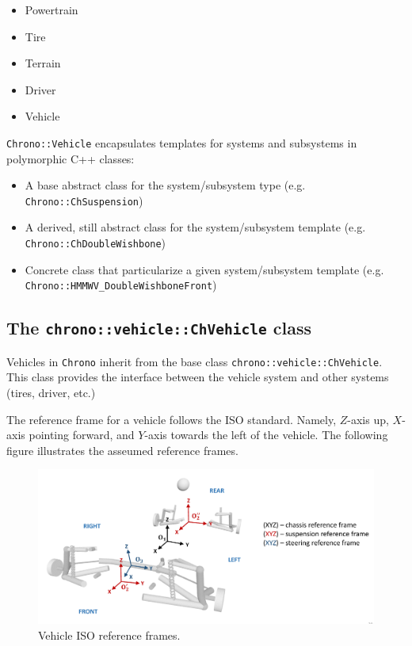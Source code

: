 \begin{itemize}
\item Powertrain
\item Tire
\item Terrain
\item Driver
\item Vehicle
\end{itemize}

\lstinline{Chrono::Vehicle} encapsulates templates for systems and subsystems in polymorphic C++ classes:

\begin{itemize}
\item A base abstract class for the system/subsystem type (e.g. \lstinline{Chrono::ChSuspension})
\item A derived, still abstract class for the system/subsystem template (e.g.  \lstinline{Chrono::ChDoubleWishbone})
\item Concrete class that particularize a given system/subsystem template (e.g. \lstinline{Chrono::HMMWV_DoubleWishboneFront})
\end{itemize}

\subsection{The \lstinline{chrono::vehicle::ChVehicle} class}

Vehicles in \lstinline{Chrono} inherit from the base class \lstinline{chrono::vehicle::ChVehicle}. 
This class provides the interface between the vehicle system and other systems (tires, driver, etc.)

The reference frame for a vehicle follows the ISO standard. 
Namely, $Z$-axis up, $X$-axis pointing forward, and $Y$-axis towards the left of the vehicle. The following figure illustrates
the asseumed reference frames.


\begin{figure}[!htb]
\begin{center}
\includegraphics[scale=0.290]{img/vehicle_iso_ref_frame.jpeg}
\end{center}
\caption{Vehicle ISO reference frames.}
\label{vehicle_iso_ref_frame}
\end{figure}

